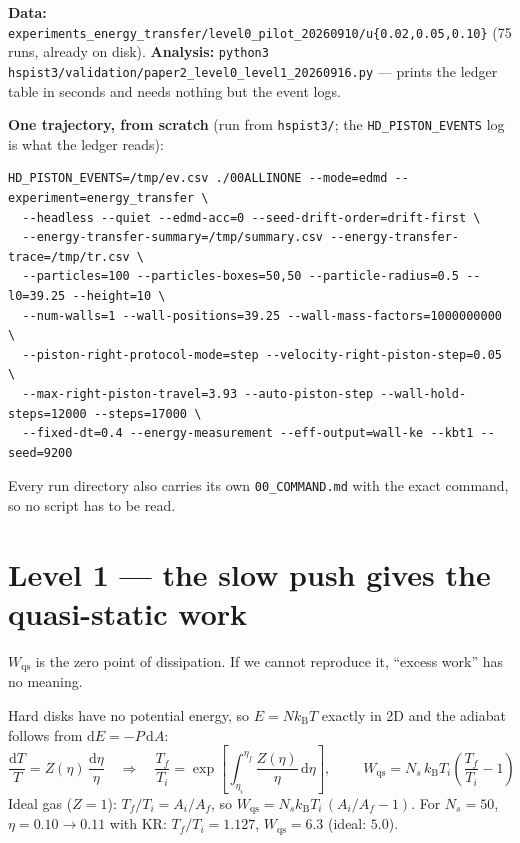 \documentclass[11pt,a4paper]{article}
\newcommand{\kT}{k_{\mathrm B}T}
\newcommand{\dd}{\mathrm{d}}
\newcommand{\cmd}[1]{\texttt{\footnotesize #1}}
\begin{document}
\begin{howto}
\textbf{Data:} \cmd{experiments\_energy\_transfer/level0\_pilot\_20260910/u\{0.02,0.05,0.10\}} (75 runs, already on disk).
\textbf{Analysis:} \cmd{python3 hspist3/validation/paper2\_level0\_level1\_20260916.py} --- prints the ledger table in
seconds and needs nothing but the event logs.

\textbf{One trajectory, from scratch} (run from \cmd{hspist3/}; the \cmd{HD\_PISTON\_EVENTS} log is what the ledger reads):
\begin{Verbatim}[fontsize=\scriptsize,frame=single,samepage=true]
HD_PISTON_EVENTS=/tmp/ev.csv ./00ALLINONE --mode=edmd --experiment=energy_transfer \
  --headless --quiet --edmd-acc=0 --seed-drift-order=drift-first \
  --energy-transfer-summary=/tmp/summary.csv --energy-transfer-trace=/tmp/tr.csv \
  --particles=100 --particles-boxes=50,50 --particle-radius=0.5 --l0=39.25 --height=10 \
  --num-walls=1 --wall-positions=39.25 --wall-mass-factors=1000000000 \
  --piston-right-protocol-mode=step --velocity-right-piston-step=0.05 \
  --max-right-piston-travel=3.93 --auto-piston-step --wall-hold-steps=12000 --steps=17000 \
  --fixed-dt=0.4 --energy-measurement --eff-output=wall-ke --kbt1 --seed=9200
\end{Verbatim}
Every run directory also carries its own \cmd{00\_COMMAND.md} with the exact command, so no script has to be read.
\end{howto}


\section{Level 1 --- the slow push gives the quasi-static work}

\begin{why}
$W_{\mathrm{qs}}$ is the zero point of dissipation. If we cannot reproduce it, ``excess work'' has no meaning.
\end{why}

Hard disks have no potential energy, so $E = N\kT$ exactly in 2D and the adiabat follows from $\dd E = -P\,\dd A$:
\begin{equation}
\frac{\dd T}{T} = Z(\eta)\,\frac{\dd\eta}{\eta}
\quad\Longrightarrow\quad
\frac{T_f}{T_i} = \exp\!\left[\int_{\eta_i}^{\eta_f}\frac{Z(\eta)}{\eta}\,\dd\eta\right],
\qquad
\boxed{\;W_{\mathrm{qs}} = N_s\,\kT_i\left(\frac{T_f}{T_i} - 1\right)\;}
\label{eq:Wqs}
\end{equation}
Ideal gas ($Z=1$): $T_f/T_i = A_i/A_f$, so $W_{\mathrm{qs}} = N_s\kT_i\,(A_i/A_f - 1)$. For $N_s = 50$, $\eta = 0.10 \to 0.11$ with KR: $T_f/T_i = 1.127$, $W_{\mathrm{qs}} = 6.3$ (ideal: $5.0$).
\end{document}
